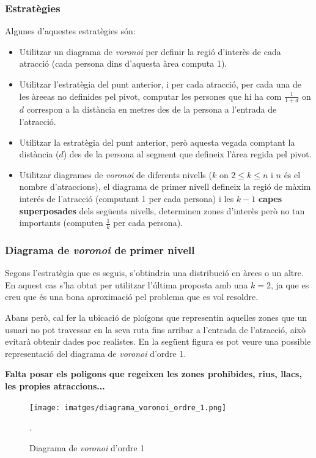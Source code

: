 \documentclass[12pt]{article}
\begin{document}
\subsubsection{Estratègies}
Algunes d'aquestes estratègies són:
\begin{itemize}
	\item Utilitzar un diagrama de \textit{voronoi} per definir la regió d'interès de cada atracció (cada persona dins d'aquesta àrea computa 1).
	\item Utilitzar l'estratègia del punt anterior, i per cada atracció, per cada una de les àreeas no definides pel pivot, computar les persones que hi ha com $\frac{1}{1+d}$ on $d$ correspon a la distància en metres des de la persona a l'entrada de l'atracció.
	\item Utilitzar la estratègia del punt anterior, però aquesta vegada comptant la distància ($d$) des de la persona al segment que defineix l'àrea regida pel pivot.
	\item Utilitzar diagrames de \textit{voronoi} de diferents nivells ($k$ on $2 \le k \le n$ i $n$ és el nombre d'atraccions), el diagrama de primer nivell defineix la regió de màxim interés de l'atracció (computant 1 per cada persona) i les $k-1$ \textbf{capes superposades} dels següents nivells, determinen zones d'interès però no tan importants (computen $\frac{1}{k}$ per cada persona).
\end{itemize}

\subsubsection{Diagrama de \textit{voronoi} de primer nivell}
Segons l'estratègia que es seguis, s'obtindria una distribució en àrees o un altre. En aquest cas s'ha obtat per utilitzar l'última proposta amb una $k = 2$, ja que es creu que és una bona aproximació pel problema que es vol resoldre. 

Abans però, cal fer la ubicació de ploígons que representin aquelles zones que un usuari no pot travessar en la seva ruta fins arribar a l'entrada de l'atracció, això evitarà obtenir dades poc realistes. En la següent figura es pot veure una possible representació del diagrama de \textit{voronoi} d'ordre 1.


\textbf{Falta posar els poligons que regeixen les zones prohibides, rius, llacs, les propies atraccions...}

\begin{figure}[H]
	\centering
	\texttt{[image: imatges/diagrama\_voronoi\_ordre\_1.png]}\par\vspace{1cm}
	\caption{Diagrama de \textit{voronoi} d'ordre 1}.
	\label{fig:diagrama_voronoi_ordre_1}
\end{figure}
\end{document}
